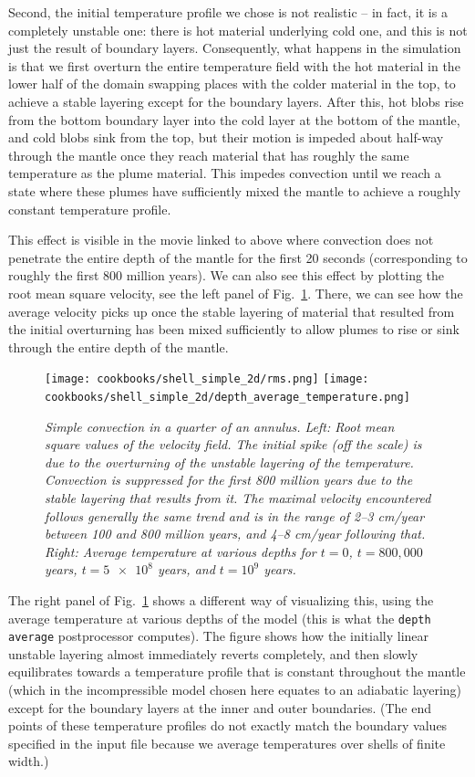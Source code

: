 \documentclass{article}
\begin{document}
Second, the initial temperature profile we chose is not realistic -- in fact, it
is a completely unstable one: there is hot material underlying cold one, and
this is not just the result of boundary layers. Consequently, what happens in
the simulation is that we first overturn the entire temperature field with the
hot material in the lower half of the domain swapping places with the colder
material in the top, to achieve a stable layering except for the boundary
layers. After this, hot blobs rise from the bottom boundary layer into the cold
layer at the bottom of the mantle, and cold blobs sink from the top, but their
motion is impeded about half-way through the mantle once they reach material
that has roughly the same temperature as the plume material. This impedes
convection until we reach a state where these plumes have sufficiently mixed the
mantle to achieve a roughly constant temperature profile.

This effect is visible in the movie linked to above where convection does not
penetrate the entire depth of the mantle for the first 20 seconds
(corresponding to roughly the first 800 million years). We can also see this
effect by plotting the root mean square velocity, see the left panel of
Fig.~\ref{fig:simple-shell-2d-rms}. There, we can see how the average velocity
picks up once the stable layering of material that resulted from the initial
overturning has been mixed sufficiently to allow plumes to rise or sink through
the entire depth of the mantle.

\begin{figure}[tb]
\texttt{[image: cookbooks/shell\_simple\_2d/rms.png]}
\hfill
\texttt{[image: cookbooks/shell\_simple\_2d/depth\_average\_temperature.png]}
\caption{\it Simple convection in a quarter of an annulus. Left: Root mean
square values of the velocity field. The initial spike (off the scale) is due to
the overturning of the unstable layering of the temperature. Convection is suppressed for the
first 800 million years due to the stable layering that results from it. The
maximal velocity encountered follows generally the same trend and is in the
range of 2--3 cm/year between 100 and 800 million years, and 4--8 cm/year
following that. Right: Average temperature at various depths for $t=0$,
$t=800,000$ years, $t=\num{5e8}$ years, and $t=10^9$ years.}
\label{fig:simple-shell-2d-rms}
\end{figure}

The right panel of Fig.~\ref{fig:simple-shell-2d-rms} shows a different way of
visualizing this, using the average temperature at various depths of the model
(this is what the \texttt{depth average} postprocessor computes). The figure
shows how the initially linear unstable layering almost immediately reverts
completely, and then slowly equilibrates towards a temperature profile that is
constant throughout the mantle (which in the incompressible model chosen here
equates to an adiabatic layering) except for the boundary layers at the inner
and outer boundaries. (The end points of these temperature profiles do not
exactly match the boundary values specified in the input file because we
average temperatures over shells of finite width.)
\end{document}
